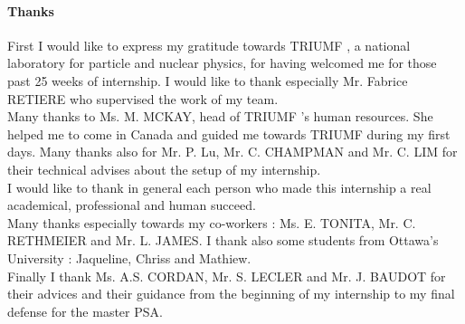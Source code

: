 \documentclass[a4paper, 11pt]{report}%
\newcommand{\TR}{TRIUMF }
\begin{document}




\setcounter{page}{1}
\newpage
\thispagestyle{empty}



\vspace{1cm}
\paragraph{Thanks}\hspace{1cm}
  
  First I would like to express my gratitude towards \TR, a national laboratory for particle and nuclear physics, for having welcomed 
  me for those past 25 weeks of internship. I would like to thank especially Mr. Fabrice RETIERE who supervised the work of my team. 
  \\ 
  
  Many thanks to Ms. M. MCKAY, head of \TR's human resources. She helped me to come in Canada and guided me towards 
  \TR during my first days.
  Many thanks also for Mr. P. Lu, Mr. C. CHAMPMAN and Mr. C. LIM for their technical advises about the setup of my internship.
  \\
  
  I would like to thank in general each person who made this internship a real academical, professional and human succeed.\\ %
  Many thanks especially towards my co-workers : Ms. E. TONITA, Mr. C. RETHMEIER and Mr. L. JAMES. I thank also 
  some students from Ottawa's University : Jaqueline, Chriss and Mathiew.
  \\
  
  Finally I thank Ms. A.S. CORDAN, Mr. S. LECLER and Mr. J. BAUDOT for their advices and their guidance from the beginning of my internship
  to my final defense for the master PSA.
  \\

\end{document}
